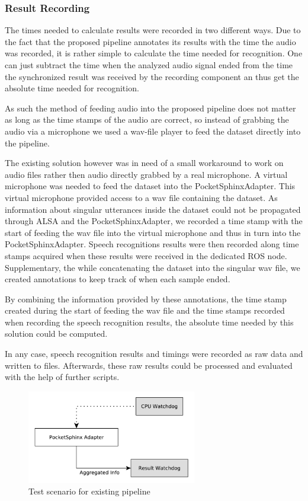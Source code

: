 \subsubsection{Result Recording}

The times needed to calculate results were recorded in two different ways.
Due to the fact that the proposed pipeline annotates its results with the time the audio was recorded, it is rather simple to calculate the time needed for recognition.
One can just subtract the time when the analyzed audio signal ended from the time the synchronized result was received by the recording component an thus get the absolute time needed for recognition.

As such the method of feeding audio into the proposed pipeline does not matter as long as the time stamps of the audio are correct, so instead of grabbing the audio via a microphone we used a wav-file player to feed the dataset directly into the pipeline.

The existing solution however was in need of a small workaround to work on audio files rather then audio directly grabbed by a real microphone.
A virtual microphone was needed to feed the dataset into the PocketSphinxAdapter.
This virtual microphone provided access to a wav file containing the dataset. 
As information about singular utterances inside the dataset could not be propagated through ALSA and the PocketSphinxAdapter, we recorded a time stamp with the start of feeding the wav file into the virtual microphone and thus in turn into the PocketSphinxAdapter.
Speech recognitions results were then recorded along time stamps acquired when these results were received in the dedicated ROS node.
Supplementary, the while concatenating the dataset into the singular wav file, we created annotations to keep track of when each sample ended.

By combining the information provided by these annotations, the time stamp created during the start of feeding the wav file and the time stamps recorded when recording the speech recognition results, the absolute time needed by this solution could be computed.

In any case, speech recognition results and timings were recorded as raw data and written to files.
Afterwards, these raw results could be processed and evaluated with the help of further scripts.


\begin{figure}[ht]
	\includegraphics[width=0.66\textwidth]{diagrams/eval_pipeline_1.pdf}
	\caption{Test scenario for existing pipeline}
	\label{pic:eval_p1_diag}
\end{figure}

